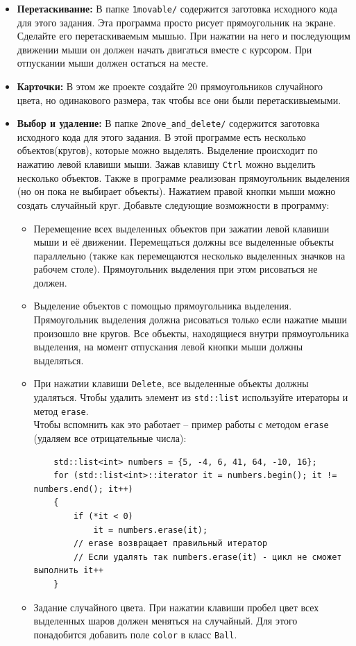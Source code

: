 \documentclass{article}
\begin{document}
\begin{itemize}
\item \textbf{Перетаскивание:} В папке \texttt{1movable/} содержится заготовка исходного кода для этого задания. Эта программа просто рисует прямоугольник на экране. Сделайте его перетаскиваемым мышью. При нажатии на него и последующим движении мыши он должен начать двигаться вместе с курсором. При отпускании мыши должен остаться на месте.

\item \textbf{Карточки:} В этом же проекте создайте 20 прямоугольников случайного цвета, но одинакового размера, так чтобы все они были перетаскивыемыми.

\item \textbf{Выбор и удаление:} В папке \texttt{2move\_and\_delete/} содержится заготовка исходного кода для этого задания. В этой программе есть несколько объектов(кругов), которые можно выделять. Выделение происходит по нажатию левой клавиши мыши. Зажав клавишу \texttt{Ctrl} можно выделить несколько объектов. Также в программе реализован прямоугольник выделения (но он пока не выбирает объекты). Нажатием правой кнопки мыши можно создать случайный круг. Добавьте следующие возможности в программу:
	\begin{itemize}
	\item Перемещение всех выделенных объектов при зажатии левой клавиши мыши и её движении. Перемещаться должны все выделенные объекты параллельно (также как перемещаются несколько выделенных значков на рабочем столе). Прямоугольник выделения при этом рисоваться не должен.
	\item Выделение объектов с помощью прямоугольника выделения. Прямоугольник выделения должна рисоваться только если нажатие мыши произошло вне кругов. Все объекты, находящиеся внутри прямоугольника выделения, на момент отпускания левой кнопки мыши должны выделяться.
	\item При нажатии клавиши \texttt{Delete}, все выделенные объекты должны удаляться. Чтобы удалить элемент из \texttt{std::list} используйте итераторы и метод \texttt{erase}. \\
	Чтобы вспомнить как это работает -- пример работы с методом \texttt{erase} (удаляем все отрицательные числа):
	\begin{lstlisting}
	std::list<int> numbers = {5, -4, 6, 41, 64, -10, 16};
	for (std::list<int>::iterator it = numbers.begin(); it != numbers.end(); it++)
	{
		if (*it < 0)
			it = numbers.erase(it);
		// erase возвращает правильный итератор
		// Если удалять так numbers.erase(it) - цикл не сможет выполнить it++
	}
	\end{lstlisting}
	\item Задание случайного цвета. При нажатии клавиши пробел цвет всех выделенных шаров должен меняться на случайный. Для этого понадобится добавить поле \texttt{color} в класс \texttt{Ball}. 
	\end{itemize}


\end{itemize}
\end{document}
